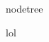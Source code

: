 \documentclass{article}
\begin{document}
\begin{NodetreeEmbedEnv}
nodetree
\end{NodetreeEmbedEnv}

lol
\end{document}

